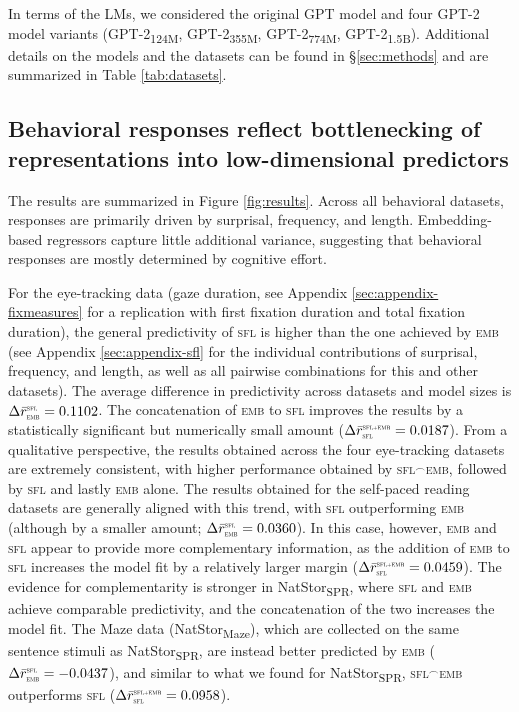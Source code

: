 \documentclass[11pt]{article}
\begin{document}
In terms of the LMs, we considered the original GPT model and four GPT-2 model variants (GPT-2\textsubscript{124M}, GPT-2\textsubscript{355M}, GPT-2\textsubscript{774M}, GPT-2\textsubscript{1.5B}). Additional details on the models and the datasets can be found in §\ref{sec:methods} and are summarized in Table \ref{tab:datasets}. 

\subsection{Behavioral responses reflect bottlenecking of representations into low-dimensional predictors}

The results are summarized in Figure \ref{fig:results}. Across all behavioral datasets, responses are primarily driven by surprisal, frequency, and length. Embedding-based regressors capture little additional variance, suggesting that behavioral responses are mostly determined by cognitive effort.

\smallskip 



For the eye-tracking data (gaze duration, see Appendix \ref{sec:appendix-fixmeasures} for a replication with first fixation duration and total fixation duration), the general predictivity of \textsc{sfl} is higher than the one achieved by \textsc{emb} (see Appendix \ref{sec:appendix-sfl} for the individual contributions of surprisal, frequency, and length, as well as all pairwise combinations for this and other datasets). The average difference in predictivity across datasets and model sizes is $\Delta \bar{r}^{\scalebox{0.4}{SFL}}_{\scalebox{0.4}{EMB}} = 0.1102$. The concatenation of \textsc{emb} to \textsc{sfl} improves the results by a statistically significant but numerically small amount ($\Delta \bar{r}^{\scalebox{0.4}{SFL+EMB}}_{\scalebox{0.4}{SFL}} = 0.0187$). From a qualitative perspective, the results obtained across the four eye-tracking datasets are extremely consistent, with higher performance obtained by \textsc{sfl}$^\frown$\textsc{emb}, followed by \textsc{sfl} and lastly \textsc{emb} alone. The results obtained for the self-paced reading datasets are generally aligned with this trend, with \textsc{sfl} outperforming \textsc{emb} (although by a smaller amount; $\Delta \bar{r}^{\scalebox{0.4}{SFL}}_{\scalebox{0.4}{EMB}} = 0.0360$). In this case, however, \textsc{emb} and \textsc{sfl} appear to provide more complementary information, as the addition of \textsc{emb} to \textsc{sfl} increases the model fit by a relatively larger margin ($\Delta \bar{r}^{\scalebox{0.4}{SFL+EMB}}_{\scalebox{0.4}{SFL}} = 0.0459$). The evidence for complementarity is stronger in NatStor\textsubscript{SPR}, where \textsc{sfl} and \textsc{emb} achieve comparable predictivity, and the concatenation of the two increases the model fit. The Maze data (NatStor\textsubscript{Maze}), which are collected on the same sentence stimuli as NatStor\textsubscript{SPR}, are instead better predicted by \textsc{emb} ($\Delta \bar{r}^{\scalebox{0.4}{SFL}}_{\scalebox{0.4}{EMB}} = -0.0437$), and similar to what we found for NatStor\textsubscript{SPR}, \textsc{sfl}$^\frown$\textsc{emb} outperforms \textsc{sfl} ($\Delta \bar{r}^{\scalebox{0.4}{SFL+EMB}}_{\scalebox{0.4}{SFL}} = 0.0958$). 
\end{document}
